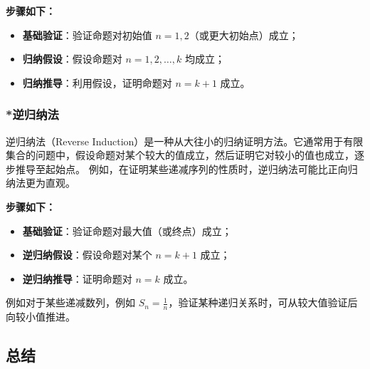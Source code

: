 \textbf{步骤如下：}
\begin{itemize}
    \item \textbf{基础验证}：验证命题对初始值 $n = 1, 2$（或更大初始点）成立；
    \item \textbf{归纳假设}：假设命题对 $n = 1, 2, \dots, k$ 均成立；
    \item \textbf{归纳推导}：利用假设，证明命题对 $n = k+1$ 成立。
\end{itemize}

\subsubsection{*逆归纳法}

逆归纳法（Reverse Induction）是一种从大往小的归纳证明方法。它通常用于有限集合的问题中，假设命题对某个较大的值成立，然后证明它对较小的值也成立，逐步推导至起始点。  
例如，在证明某些递减序列的性质时，逆归纳法可能比正向归纳法更为直观。

\textbf{步骤如下：}
\begin{itemize}
    \item \textbf{基础验证}：验证命题对最大值（或终点）成立；
    \item \textbf{逆归纳假设}：假设命题对某个 $n = k+1$ 成立；
    \item \textbf{逆归纳推导}：证明命题对 $n = k$ 成立。
\end{itemize}

例如对于某些递减数列，例如 $S_n = \frac{1}{n}$，验证某种递归关系时，可从较大值验证后向较小值推进。

\subsection*{总结}

